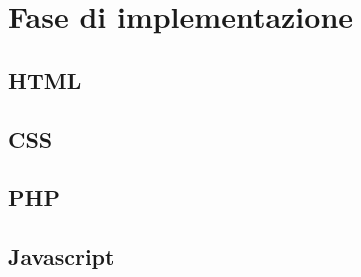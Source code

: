 \section{Fase di implementazione}
\label{sec:fase_di_implementazione}
\subsection{HTML}

\subsection{CSS}

\subsection{PHP}

\subsection{Javascript}

